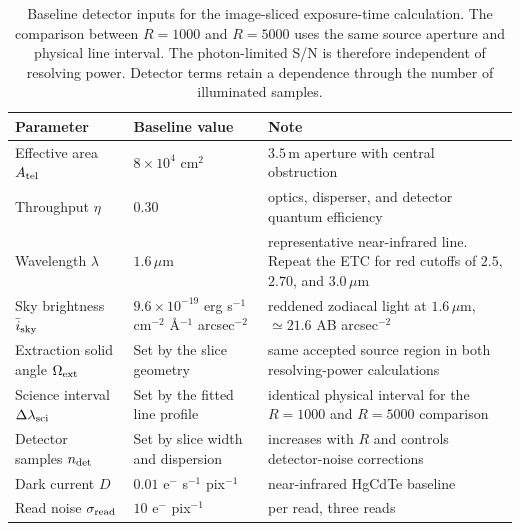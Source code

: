 \begin{table}[htbp]
\centering
\sffamily\small
\begin{tabularx}{\textwidth}{@{}l p{3.1cm} X@{}}
\toprule
\textbf{Parameter} & \textbf{Baseline value} & \textbf{Note}\\
\midrule
Effective area $A_{\rm tel}$ & $8\times10^{4}$ cm$^{2}$ & $3.5$\,m aperture with central obstruction\\
Throughput $\eta$ & $0.30$ & optics, disperser, and detector quantum efficiency\\
Wavelength $\lambda$ & $1.6\,\mu$m & representative near-infrared line. Repeat the ETC for red cutoffs of $2.5$, $2.70$, and $3.0\,\mu$m\\
Sky brightness $\bar i_{\rm sky}$ & $9.6\times10^{-19}$ erg s$^{-1}$ cm$^{-2}$ \AA$^{-1}$ arcsec$^{-2}$ & reddened zodiacal light at $1.6\,\mu$m, $\simeq21.6$ AB arcsec$^{-2}$ \cite{leinert1998}\\
Extraction solid angle $\Omega_{\rm ext}$ & Set by the slice geometry & same accepted source region in both resolving-power calculations\\
Science interval $\Delta\lambda_{\rm sci}$ & Set by the fitted line profile & identical physical interval for the $R=1000$ and $R=5000$ comparison\\
Detector samples $n_{\rm det}$ & Set by slice width and dispersion & increases with $R$ and controls detector-noise corrections\\
Dark current $D$ & $0.01$ e$^-$ s$^{-1}$ pix$^{-1}$ & near-infrared HgCdTe baseline\\
Read noise $\sigma_{\rm read}$ & $10$ e$^-$ pix$^{-1}$ & per read, three reads\\
\bottomrule
\end{tabularx}
\caption{Baseline detector inputs for the image-sliced exposure-time calculation. The comparison between $R=1000$ and $R=5000$ uses the same source aperture and physical line interval. The photon-limited S/N is therefore independent of resolving power. Detector terms retain a dependence through the number of illuminated samples.}
\label{tab:etc}
\end{table}

